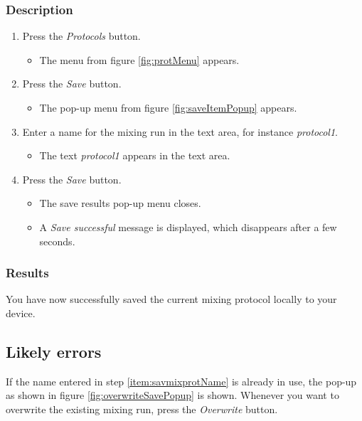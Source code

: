 \subsubsection{Description}
\begin{enumerate}
	\item Press the \emph{Protocols} button.
		\begin{itemize}
			\item The menu from figure \ref{fig:protMenu} appears.
		\end{itemize}
	\item Press the \emph{Save} button.
		\begin{itemize}
			\item The pop-up menu from figure \ref{fig:saveItemPopup} appears.
		\end{itemize}
	\item Enter a name for the mixing run in the text area, for instance \emph{protocol1}. \label{item:savmixprotName}
		\begin{itemize}
			\item The text \emph{protocol1} appears in the text area.
		\end{itemize}
	\item Press the \emph{Save} button.
		\begin{itemize}
			\item The save results pop-up menu closes.
			\item A \emph{Save successful} message is displayed, which disappears after a few seconds.
		\end{itemize}
\end{enumerate}

\subsubsection{Results}
You have now successfully saved the current mixing protocol locally to your device.

\subsection{Likely errors}
If the name entered in step \ref{item:savmixprotName} is already in use, the pop-up as shown in figure \ref{fig:overwriteSavePopup} is shown. Whenever you want to overwrite the existing mixing run, press the \emph{Overwrite} button.


